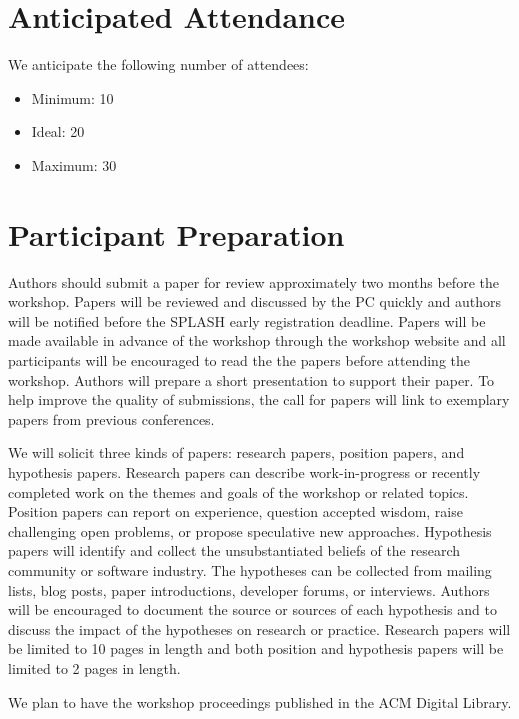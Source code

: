 \documentclass{sigplanconf}
\begin{document}
\section{Anticipated Attendance}

We anticipate the following number of attendees:

\begin{itemize}
\item Minimum: 10 
\item Ideal: 20
\item Maximum: 30 
\end{itemize}

\section{Participant Preparation}\label{preparation}

Authors should submit a paper for review approximately two months before the workshop. Papers will be reviewed and discussed by the PC quickly and authors will be notified before the SPLASH early registration deadline. Papers will be made available in advance of the workshop through the workshop website and all participants will be encouraged to read the the papers before attending the workshop. Authors will prepare a short presentation to support their paper. To help improve the quality of submissions, the call for papers will link to exemplary papers from previous conferences.

We will solicit three kinds of papers: research papers,  position papers, and hypothesis papers. Research papers can  describe work-in-progress or recently completed work on the themes and goals of the workshop or related topics. Position papers can report on experience, question accepted wisdom, raise challenging open problems, or propose speculative new approaches. Hypothesis papers will identify and collect the unsubstantiated beliefs of the research community or software industry. The hypotheses can be collected from mailing lists, blog posts, paper introductions,  developer forums, or interviews. Authors will be encouraged to document the source or sources of each hypothesis and to discuss the impact of the hypotheses on research or practice. Research papers will be limited to 10 pages in length and both position and hypothesis papers will be limited to 2 pages in length. 

We plan to have the workshop proceedings published in the ACM Digital Library.

\end{document}
